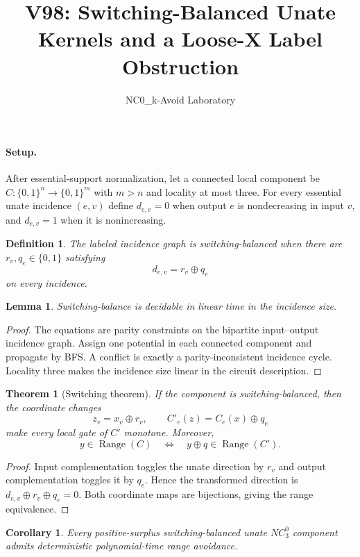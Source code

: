 \documentclass[11pt]{article}
\title{V98: Switching-Balanced Unate Kernels and a Loose-X Label Obstruction}
\author{NC0\_k-Avoid Laboratory}
\date{}
\newtheorem{theorem}{Theorem}
\newtheorem{lemma}{Lemma}
\newtheorem{corollary}{Corollary}
\newtheorem{definition}{Definition}
\begin{document}
\maketitle

\paragraph{Setup.}
After essential-support normalization, let a connected local component be
$C:\{0,1\}^n\to\{0,1\}^m$ with $m>n$ and locality at most three.
For every essential unate incidence $(e,v)$ define
$d_{e,v}=0$ when output $e$ is nondecreasing in input $v$, and $d_{e,v}=1$
when it is nonincreasing.

\begin{definition}
The labeled incidence graph is \emph{switching-balanced} when there are
$r_v,q_e\in\{0,1\}$ satisfying
\[
d_{e,v}=r_v\oplus q_e
\]
on every incidence.
\end{definition}

\begin{lemma}
Switching-balance is decidable in linear time in the incidence size.
\end{lemma}

\begin{proof}
The equations are parity constraints on the bipartite input--output incidence
graph. Assign one potential in each connected component and propagate by BFS.
A conflict is exactly a parity-inconsistent incidence cycle. Locality three
makes the incidence size linear in the circuit description.
\end{proof}

\begin{theorem}[Switching theorem]
If the component is switching-balanced, then the coordinate changes
\[
z_v=x_v\oplus r_v,\qquad C'_e(z)=C_e(x)\oplus q_e
\]
make every local gate of $C'$ monotone.
Moreover,
\[
y\in \operatorname{Range}(C)
\quad\Longleftrightarrow\quad
y\oplus q\in\operatorname{Range}(C').
\]
\end{theorem}

\begin{proof}
Input complementation toggles the unate direction by $r_v$ and output
complementation toggles it by $q_e$. Hence the transformed direction is
$d_{e,v}\oplus r_v\oplus q_e=0$. Both coordinate maps are bijections, giving
the range equivalence.
\end{proof}

\begin{corollary}
Every positive-surplus switching-balanced unate $NC^0_3$ component admits
deterministic polynomial-time range avoidance.
\end{corollary}
\end{document}
